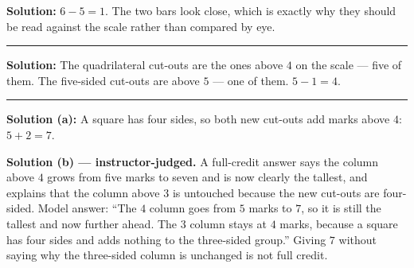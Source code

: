 \documentclass[12pt]{article}
\begin{document}
\textbf{Solution:} $6 - 5 = 1$. The two bars look close, which is exactly why they should be read
against the scale rather than compared by eye. 

\vspace{0.12cm}\noindent\rule{\linewidth}{0.2pt}


\textbf{Solution:} The quadrilateral cut-outs are the ones above $4$ on the scale --- five of them.
The five-sided cut-outs are above $5$ --- one of them. $5 - 1 = 4$. 

\vspace{0.12cm}\noindent\rule{\linewidth}{0.2pt}


\textbf{Solution (a):} A square has four sides, so both new cut-outs add marks above $4$:
$5 + 2 = 7$. 

\textbf{Solution (b) --- instructor-judged.} A full-credit answer says the column above $4$ grows from
five marks to seven and is now clearly the tallest, and explains that the column above $3$ is
untouched because the new cut-outs are four-sided. Model answer: ``The $4$ column goes from $5$ marks
to $7$, so it is still the tallest and now further ahead. The $3$ column stays at $4$ marks, because a
square has four sides and adds nothing to the three-sided group.'' Giving $7$ without saying why the
three-sided column is unchanged is not full credit.
\end{document}
